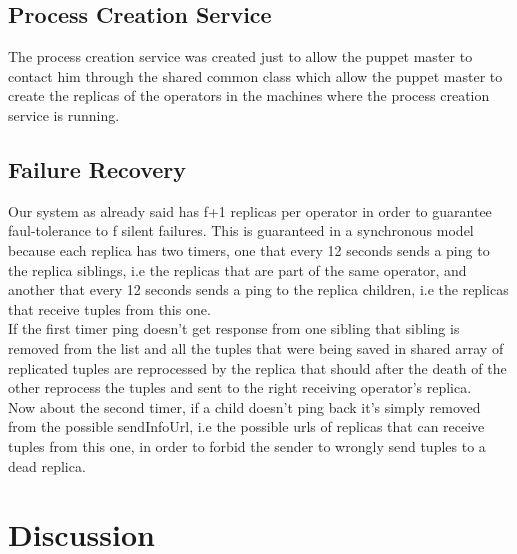 \documentclass[times, 10pt, twocolumn]{article}
\begin{document}
\subsection{Process Creation Service}
The process creation service was created just to allow the puppet master to contact him through the shared common class which allow the puppet master to create the replicas of the operators in the machines where the process creation service is running.



\subsection{Failure Recovery}
Our system as already said has f+1 replicas per operator in order to guarantee faul-tolerance to f silent failures. This is guaranteed in a synchronous model because each replica has two timers, one that every 12 seconds sends a ping to the replica siblings, i.e the replicas that are part of the same operator, and another that every 12 seconds sends a ping to the replica children, i.e the replicas that receive tuples from this one.
\\If the first timer ping doesn't get response from one sibling that sibling is removed from the list and all the tuples that were being saved in shared array of replicated tuples are reprocessed by the replica that should after the death of the other reprocess the tuples and sent to the right receiving operator's replica.
\\Now about the second timer, if a child doesn't ping back it's simply removed from the possible sendInfoUrl, i.e the possible urls of replicas that can receive tuples from this one, in order to forbid the sender to wrongly send tuples to a dead replica.





\section{Discussion}




\end{document}
